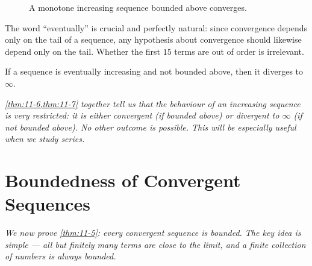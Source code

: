 \begin{figure}[ht]
  \centering
  
  \caption{A monotone increasing sequence bounded above converges.}
  \label{fig:monotone-bounded-convergence}
\end{figure}

\begin{remark}
The word ``eventually'' is crucial and perfectly natural: since convergence depends only on the tail of a sequence, any hypothesis about convergence should likewise depend only on the tail.  Whether the first $15$ terms are out of order is irrelevant.
\end{remark}

\begin{theorem}
\label{thm:11-7}
If a sequence is eventually increasing and not bounded above, then it diverges to $\infty$.
\end{theorem}

\textit{\cref{thm:11-6,thm:11-7} together tell us that the behaviour of an increasing sequence is very restricted: it is either convergent (if bounded above) or divergent to $\infty$ (if not bounded above).  No other outcome is possible.  This will be especially useful when we study series.}

\section{Boundedness of Convergent Sequences}
\label{sec:11.5}

\textit{We now prove \cref{thm:11-5}: every convergent sequence is bounded.  The key idea is simple --- all but finitely many terms are close to the limit, and a finite collection of numbers is always bounded.}

